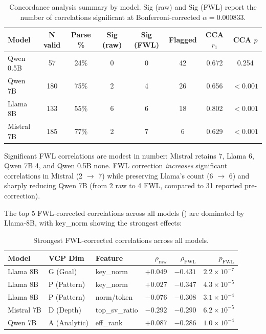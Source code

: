 \documentclass[11pt,a4paper]{article}
\begin{document}
\begin{table}[H]
\centering
\caption{Concordance analysis summary by model. Sig (raw) and Sig (FWL) report the number of correlations significant at Bonferroni-corrected $\alpha = 0.000833$.}
\label{tab:model_summary}
\begin{tabular}{lccccccc}
\toprule
\textbf{Model} & \textbf{N valid} & \textbf{Parse \%} & \textbf{Sig (raw)} & \textbf{Sig (FWL)} & \textbf{Flagged} & \textbf{CCA $r_1$} & \textbf{CCA $p$} \\
\midrule
Qwen 0.5B      & 57  & 24\% & 0  & 0  & 42 & 0.672 & 0.254 \\
Qwen 7B        & 180 & 75\% & 2  & 4  & 26 & 0.656 & ${<}0.001$ \\
Llama 8B       & 133 & 55\% & 6  & 6  & 18 & 0.802 & ${<}0.001$ \\
Mistral 7B     & 185 & 77\% & 2  & 7  & 6  & 0.629 & ${<}0.001$ \\
\bottomrule
\end{tabular}
\end{table}

Significant FWL correlations are modest in number: Mistral retains 7, Llama 6, Qwen 7B 4, and Qwen 0.5B none. FWL correction \emph{increases} significant correlations in Mistral (2 $\to$ 7) while preserving Llama's count (6 $\to$ 6) and sharply reducing Qwen 7B (from 2 raw to 4 FWL, compared to 31 reported pre-correction).

The top 5 FWL-corrected correlations across all models () are dominated by Llama-8B, with key\_norm showing the strongest effects:

\begin{table}[H]
\centering
\caption{Strongest FWL-corrected correlations across all models.}
\label{tab:top_corr}
\begin{tabular}{lllrrr}
\toprule
\textbf{Model} & \textbf{VCP Dim} & \textbf{Feature} & $\rho_{\text{raw}}$ & $\rho_{\text{FWL}}$ & $p_{\text{FWL}}$ \\
\midrule
Llama 8B   & G (Goal)      & key\_norm      & $+0.049$ & $-0.431$ & $2.2 \times 10^{-7}$ \\
Llama 8B   & P (Pattern)   & key\_norm      & $+0.027$ & $-0.347$ & $4.3 \times 10^{-5}$ \\
Llama 8B   & P (Pattern)   & norm/token     & $-0.076$ & $-0.308$ & $3.1 \times 10^{-4}$ \\
Mistral 7B & D (Depth)     & top\_sv\_ratio & $-0.292$ & $-0.290$ & $6.2 \times 10^{-5}$ \\
Qwen 7B    & A (Analytic)  & eff\_rank      & $+0.087$ & $-0.286$ & $1.0 \times 10^{-4}$ \\
\bottomrule
\end{tabular}
\end{table}
\end{document}
